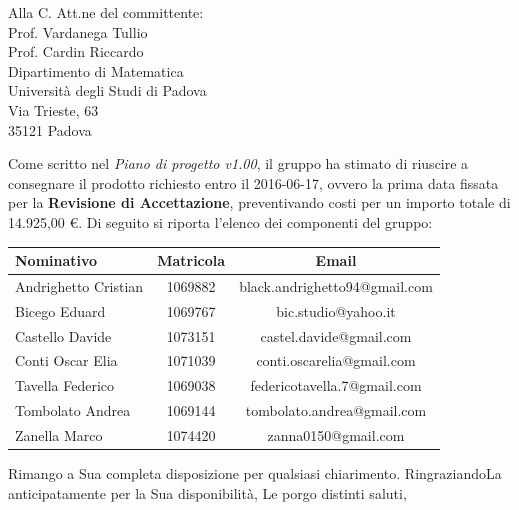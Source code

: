 \documentclass[a4paper,12pt]{letteracdp}
\begin{document}
\begin{letter}{
		Alla C. Att.ne del committente: \\
		Prof. Vardanega Tullio \\
		Prof. Cardin Riccardo \\
		Dipartimento di Matematica \\
		Università degli Studi di Padova \\
		Via Trieste, 63 \\
		35121 Padova}
\begin{itemize}
\end{itemize}

Come scritto nel \textit{Piano di progetto v1.00}, il gruppo ha stimato di riuscire a consegnare il prodotto richiesto entro il 2016-06-17, ovvero la prima data fissata per la \textbf{Revisione di Accettazione}, preventivando costi per un importo totale di 14.925,00 \euro. Di seguito si riporta l'elenco dei componenti del gruppo:

\begin{center}
		\begin{tabular}{l c c}
			\toprule
			\textbf{Nominativo} & \textbf{Matricola} & \textbf{Email} \\
			\midrule
			Andrighetto Cristian & 1069882 & black.andrighetto94@gmail.com \\
			Bicego Eduard & 1069767 & bic.studio@yahoo.it  \\
			Castello Davide	& 1073151 &	 castel.davide@gmail.com\\
			Conti Oscar Elia & 1071039 & conti.oscarelia@gmail.com \\
			Tavella Federico & 1069038 & federicotavella.7@gmail.com\\
			Tombolato Andrea & 1069144 & tombolato.andrea@gmail.com	 \\
			Zanella Marco & 1074420 & zanna0150@gmail.com \\
			\bottomrule
		\end{tabular}
\end{center}
		
		\closing{Rimango a Sua completa disposizione per qualsiasi chiarimento. RingraziandoLa anticipatamente per la Sua disponibilità, Le porgo distinti saluti,}
		
	\end{letter}
\end{document}
